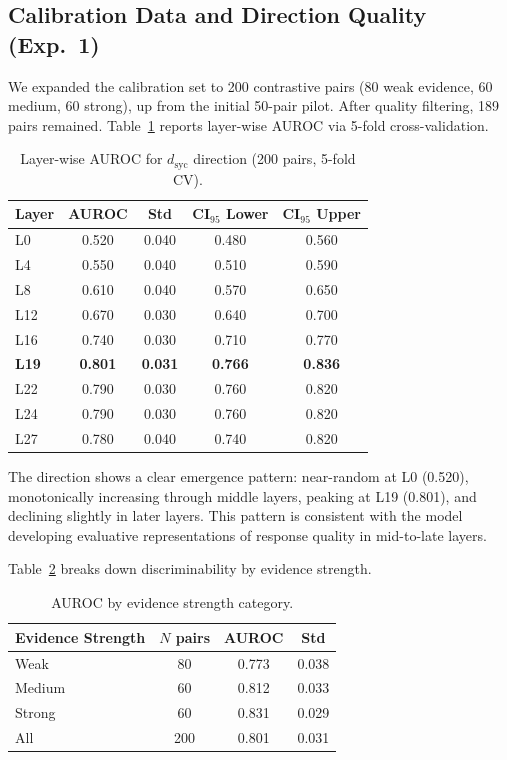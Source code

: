 \documentclass[11pt,a4paper]{article}
\newcommand{\dsyc}{$d_{\text{syc}}$}
\begin{document}
\subsection{Calibration Data and Direction Quality (Exp.\ 1)}
\label{sec:exp1}

We expanded the calibration set to 200 contrastive pairs (80 weak evidence, 60 medium, 60 strong), up from the initial 50-pair pilot. After quality filtering, 189 pairs remained. Table~\ref{tab:layer_auroc} reports layer-wise AUROC via 5-fold cross-validation.

\begin{table}[h]
\centering
\small
\caption{Layer-wise AUROC for \dsyc{} direction (200 pairs, 5-fold CV).}
\label{tab:layer_auroc}
\begin{tabular}{lcccc}
\toprule
Layer & AUROC & Std & CI$_{95}$ Lower & CI$_{95}$ Upper \\
\midrule
L0  & 0.520 & 0.040 & 0.480 & 0.560 \\
L4  & 0.550 & 0.040 & 0.510 & 0.590 \\
L8  & 0.610 & 0.040 & 0.570 & 0.650 \\
L12 & 0.670 & 0.030 & 0.640 & 0.700 \\
L16 & 0.740 & 0.030 & 0.710 & 0.770 \\
\textbf{L19} & \textbf{0.801} & \textbf{0.031} & \textbf{0.766} & \textbf{0.836} \\
L22 & 0.790 & 0.030 & 0.760 & 0.820 \\
L24 & 0.790 & 0.030 & 0.760 & 0.820 \\
L27 & 0.780 & 0.040 & 0.740 & 0.820 \\
\bottomrule
\end{tabular}
\end{table}

The direction shows a clear emergence pattern: near-random at L0 (0.520), monotonically increasing through middle layers, peaking at L19 (0.801), and declining slightly in later layers. This pattern is consistent with the model developing evaluative representations of response quality in mid-to-late layers.

Table~\ref{tab:evidence_auroc} breaks down discriminability by evidence strength.

\begin{table}[h]
\centering
\small
\caption{AUROC by evidence strength category.}
\label{tab:evidence_auroc}
\begin{tabular}{lccc}
\toprule
Evidence Strength & $N$ pairs & AUROC & Std \\
\midrule
Weak   & 80  & 0.773 & 0.038 \\
Medium & 60  & 0.812 & 0.033 \\
Strong & 60  & 0.831 & 0.029 \\
All    & 200 & 0.801 & 0.031 \\
\bottomrule
\end{tabular}
\end{table}
\end{document}
